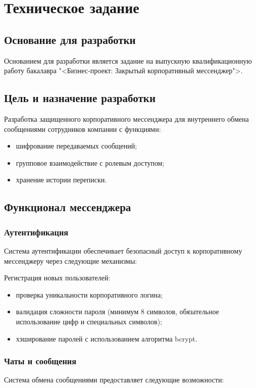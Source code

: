 \section{Техническое задание}
\subsection{Основание для разработки}

Основанием для разработки является задание на выпускную квалификационную работу бакалавра "<Бизнес-проект: Закрытый корпоративный мессенджер">.

\subsection{Цель и назначение разработки}

Разработка защищенного корпоративного мессенджера для внутреннего обмена сообщениями сотрудников компании с функциями:
\begin{itemize}
	\item шифрование передаваемых сообщений;
	\item групповое взаимодействие с ролевым доступом;
	\item хранение истории переписки.
\end{itemize}


\subsection{Функционал мессенджера}

\subsubsection{Аутентификация}
Система аутентификации обеспечивает безопасный доступ к корпоративному мессенджеру через следующие механизмы:

Регистрация новых пользователей:

\begin{itemize}
	\item проверка уникальности корпоративного логина;
	\item валидация сложности пароля (минимум 8 символов, обязательное использование цифр и специальных символов);
	\item хэширование паролей с использованием алгоритма bcrypt.
\end{itemize}

\subsubsection{Чаты и сообщения}
Система обмена сообщениями предоставляет следующие возможности:

